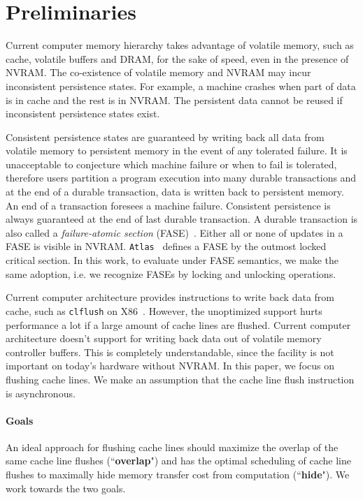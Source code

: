\documentclass[preprint,nocopyrightspace,10pt]{sigplanconf}
\begin{document}
\section{Preliminaries}
\label{sec:back}
Current computer memory hierarchy takes advantage of volatile memory, such as
cache, volatile buffers and DRAM, for the sake of speed, even in the presence of 
NVRAM. The co-existence of volatile memory and NVRAM may incur inconsistent 
persistence states. For example, a machine crashes when part of data is in cache 
and the rest is in NVRAM. The persistent data cannot be reused if inconsistent 
persistence states exist.

Consistent persistence states are guaranteed by writing back all data from volatile
memory to persistent memory in the event of any tolerated failure. 
It is unacceptable to conjecture which machine failure or when to fail is tolerated, therefore
users partition a program execution into many durable transactions and at the end of a
durable transaction, data is written back to persistent memory. An end of a transaction
foresees a machine failure. Consistent persistence is always guaranteed at the end of 
last durable transaction. A durable transaction is also called a \emph{failure-atomic
section} (FASE)~\cite{Dhruva+:OOPSLA14}. Either all or none of updates in a FASE is
visible in NVRAM. \texttt{Atlas}~\cite{Dhruva+:OOPSLA14} defines a FASE by the outmost
locked critical section. In this work, to evaluate under FASE semantics, we make the
same adoption, i.e. we recognize FASEs by locking and unlocking operations.

Current computer architecture provides instructions to write back data from cache, 
such as \texttt{clflush} on X86~\cite{?}. However, the unoptimized support hurts performance a lot if a large
amount of cache lines are flushed. Current computer architecture doesn't support 
for writing back data out of volatile memory controller buffers. This is completely 
understandable, since the facility is not important on today's hardware without NVRAM. 
In this paper, we focus on flushing cache lines. We make an assumption that the cache 
line flush instruction is asynchronous.

\paragraph{Goals}
An ideal approach for flushing cache lines should maximize the overlap of the same 
cache line flushes (``{\bf overlap}") and has the optimal scheduling of cache line flushes 
to maximally hide memory transfer cost from computation (``{\bf hide}"). We work towards 
the two goals.
\end{document}

